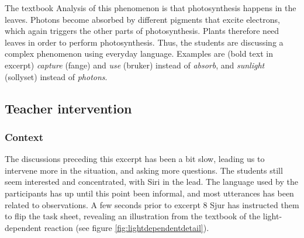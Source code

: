  The textbook Analysis of this phenomenon is that photosynthesis happens in the leaves. Photons become absorbed by different pigments that excite electrons, which again triggers the other parts of photosynthesis. Plants therefore need leaves in order to perform photosynthesis. Thus, the students are discussing a complex phenomenon using everyday language. Examples are (bold text in excerpt) \textit{capture} (fange) and \textit{use} (bruker) instead of \textit{absorb}, and \textit{sunlight} (sollyset) instead of \textit{photons}. 

\subsection{Teacher intervention}

\subsubsection*{Context}
The discussions preceding this excerpt has been a bit slow, leading us to intervene more in the situation, and asking more questions. The students still seem interested and concentrated, with Siri in the lead. The language used by the participants has up until this point been informal, and most utterances has been related to observations. A few seconds prior to excerpt 8 Sjur has instructed them to flip the task sheet, revealing an illustration from the textbook of the light-dependent reaction (see figure \ref{fig:lightdependentdetail}).


